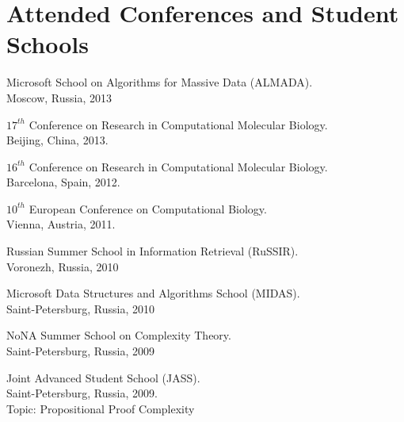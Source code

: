 \section{Attended Conferences and Student Schools}
%
\begin{innerlist}

\item Microsoft School on Algorithms for Massive Data (ALMADA). \\
Moscow, Russia, 2013

\item $17^{th}$ Conference on Research in Computational Molecular Biology.\\ 
Beijing, China, 2013.

\item $16^{th}$ Conference on Research in Computational Molecular Biology.\\ 
Barcelona, Spain, 2012.

\item $10^{th}$ European Conference on Computational Biology.\\ 
Vienna, Austria, 2011.

\item Russian Summer School in Information Retrieval (RuSSIR).\\ 
Voronezh, Russia, 2010

\item Microsoft Data Structures and Algorithms School (MIDAS).\\ 
Saint-Petersburg, Russia, 2010

\item NoNA Summer School on Complexity Theory.\\
Saint-Petersburg, Russia, 2009

\item Joint Advanced Student School (JASS).\\
Saint-Petersburg, Russia, 2009.\\ 
Topic: Propositional Proof Complexity

\end{innerlist}

